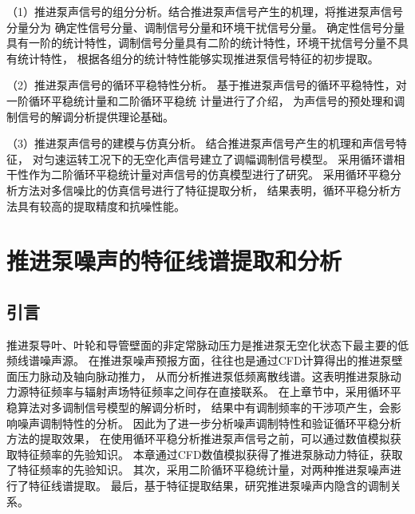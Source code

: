 （1）推进泵声信号的组分分析。结合推进泵声信号产生的机理，将推进泵声信号分量分为
确定性信号分量、调制信号分量和环境干扰信号分量。
确定性信号分量具有一阶的统计特性，调制信号分量具有二阶的统计特性，环境干扰信号分量不具有统计特性，
根据各组分的统计特性能够实现推进泵信号特征的初步提取。 

（2）推进泵声信号的循环平稳特性分析。
基于推进泵声信号的循环平稳特性，对一阶循环平稳统计量和二阶循环平稳统
计量进行了介绍，
为声信号的预处理和调制信号的解调分析提供理论基础。

（3）推进泵声信号的建模与仿真分析。
结合推进泵声信号产生的机理和声信号特征，
对匀速运转工况下的无空化声信号建立了调幅调制信号模型。
采用循环谱相干性作为二阶循环平稳统计量对声信号的仿真模型进行了研究。
采用循环平稳分析方法对多信噪比的仿真信号进行了特征提取分析，
结果表明，循环平稳分析方法具有较高的提取精度和抗噪性能。

\chapter{推进泵噪声的特征线谱提取和分析}
\section{引言}
\begin{comment}
由经典声学理论可知，脉动力源远场辐射噪声的声压表达式为
\begin{equation}
    \label{equ:p}
    p\left ( \mathbf{r} ,t \right ) =\frac{\mathbf{F}\cdot \mathbf{r} }{4\pi rc} =\frac{F\left ( t' \right ) }{4\pi rc}\cos \theta  
\end{equation}
式中，$t'$为迟滞时间，$\mathbf{F}$为脉动力，$r$为脉动力源到测点距离，$\theta$为与矢量之间夹角，
$\cos \theta$项用于表征脉动力源的偶极声场指向性，该式表明了脉动力源与其辐射声场之间的直接联系\cite{__2016杨琼方}。
\end{comment}
推进泵导叶、叶轮和导管壁面的非定常脉动压力是推进泵无空化状态下最主要的低频线谱噪声源\cite{__2016杨琼方}。
在推进泵噪声预报方面，往往也是通过CFD计算得出的推进泵壁面压力脉动及轴向脉动推力，
从而分析推进泵低频离散线谱。这表明推进泵脉动力源特征频率与辐射声场特征频率之间存在直接联系。
在上章节中，采用循环平稳算法对多调制信号模型的解调分析时，
结果中有调制频率的干涉项产生，会影响噪声调制特性的分析。
因此为了进一步分析噪声调制特性和验证循环平稳分析方法的提取效果，
在使用循环平稳分析推进泵声信号之前，可以通过数值模拟获取特征频率的先验知识。
本章通过CFD数值模拟获得了推进泵脉动力特征，获取了特征频率的先验知识。
其次，采用二阶循环平稳统计量，对两种推进泵噪声进行了特征线谱提取。
最后，基于特征提取结果，研究推进泵噪声内隐含的调制关系。

